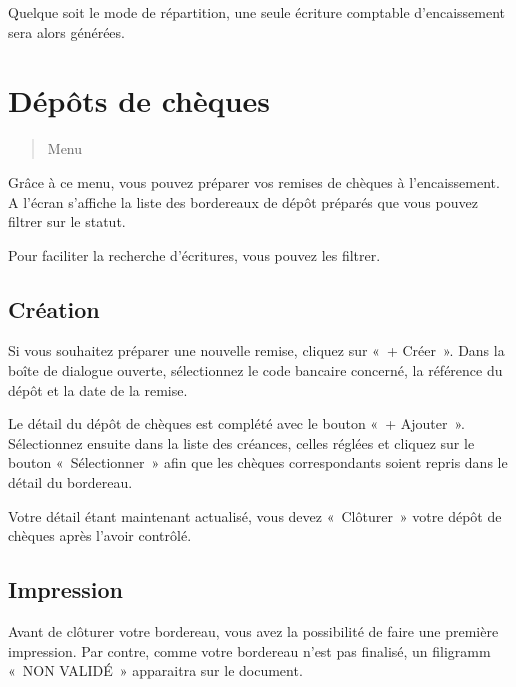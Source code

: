 \documentclass[a4paper,10pt,oneside,french]{sphinxmanual}
\begin{document}
\sphinxAtStartPar
Quelque soit le mode de répartition, une seule écriture comptable d’encaissement sera alors générées.

\sphinxstepscope


\section{Dépôts de chèques}
\label{\detokenize{payoff/deposit:depots-de-cheques}}\label{\detokenize{payoff/deposit::doc}}\begin{quote}

\sphinxAtStartPar
Menu 
\end{quote}

\sphinxAtStartPar
Grâce à ce menu, vous pouvez préparer vos remises de chèques à l’encaissement.
A l’écran s’affiche la liste des bordereaux de dépôt préparés que vous pouvez filtrer sur le statut.
\begin{quote}

\noindent{}
\end{quote}

\sphinxAtStartPar
Pour faciliter la recherche d’écritures, vous pouvez les filtrer.


\subsection{Création}
\label{\detokenize{payoff/deposit:creation}}
\sphinxAtStartPar
Si vous souhaitez préparer une nouvelle remise, cliquez sur « + Créer ».
Dans la boîte de dialogue ouverte, sélectionnez le code bancaire concerné, la référence du dépôt et la date de la remise.

\sphinxAtStartPar
Le détail du dépôt de chèques est complété avec le bouton « + Ajouter ».
Sélectionnez ensuite dans la liste des créances, celles réglées et cliquez sur le bouton « Sélectionner » afin que les chèques correspondants soient repris dans le détail du bordereau.
\begin{quote}

\noindent{}
\end{quote}

\sphinxAtStartPar
Votre détail étant maintenant actualisé, vous devez « Clôturer » votre dépôt de chèques après l’avoir contrôlé.


\subsection{Impression}
\label{\detokenize{payoff/deposit:impression}}
\sphinxAtStartPar
Avant de clôturer votre bordereau, vous avez la possibilité de faire une première impression.
Par contre, comme votre bordereau n’est pas finalisé, un filigramm « NON VALIDÉ » apparaitra sur le document.
\end{document}
